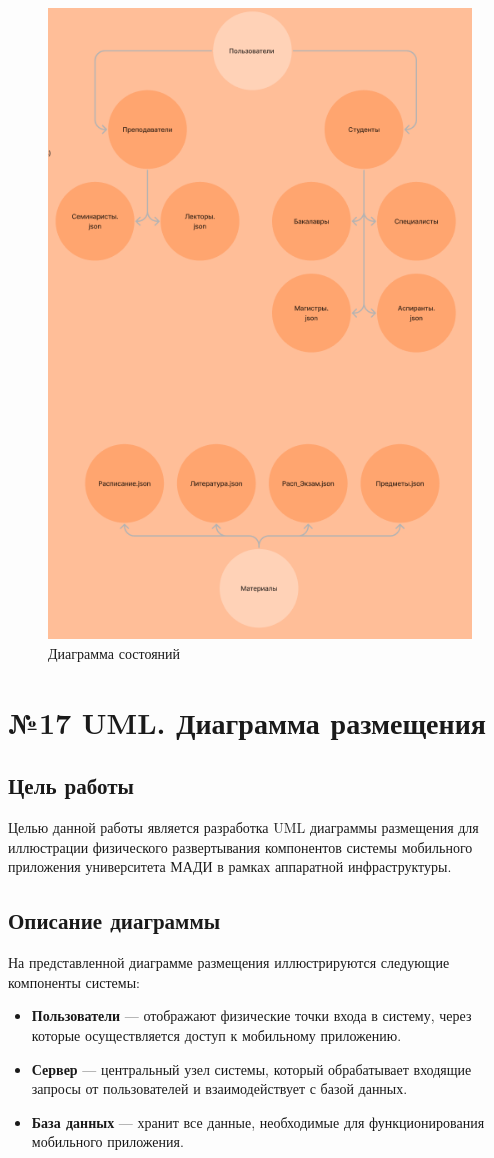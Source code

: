 \documentclass[a4paper,12pt]{article}
\begin{document}
\begin{figure}[-h]
    \centering
    \includegraphics[width=0.5\linewidth]{16UML.png}
    \caption{Диаграмма состояний}
\end{figure}


\section{№17 UML. Диаграмма размещения}

\subsection{Цель работы}
Целью данной работы является разработка UML диаграммы размещения для иллюстрации физического развертывания компонентов системы мобильного приложения университета МАДИ в рамках аппаратной инфраструктуры.

\subsection{Описание диаграммы}
На представленной диаграмме размещения иллюстрируются следующие компоненты системы:
\begin{itemize}
  \item \textbf{Пользователи} — отображают физические точки входа в систему, через которые осуществляется доступ к мобильному приложению.
  \item \textbf{Сервер} — центральный узел системы, который обрабатывает входящие запросы от пользователей и взаимодействует с базой данных.
  \item \textbf{База данных} — хранит все данные, необходимые для функционирования мобильного приложения.
\end{itemize}
\end{document}
